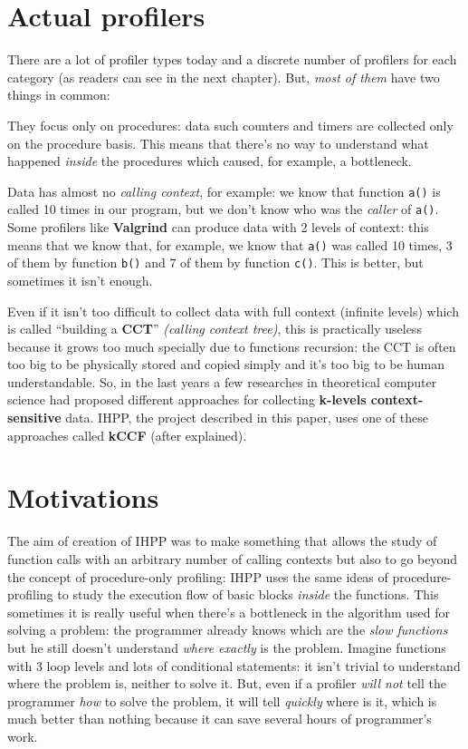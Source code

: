 \documentclass[a4paper,11pt]{report}
\begin{document}
\section{Actual profilers}

There are a lot of profiler types today and a discrete number of profilers for each category (as readers can see in the next chapter). But, \emph{most of them} have two things in common:

\begin{itemize*}
\item They focus only on procedures: data such counters and timers are collected only on the procedure basis. This means that there's no way to understand what happened \emph{inside} the procedures which caused, for example, a bottleneck.
\item Data has almost no \emph{calling context}, for example: we know that function \verb|a()| is called 10 times in our program, but we don't know who was the \emph{caller} of \verb|a()|. Some profilers like \textbf{Valgrind} can produce data with 2 levels of context: this means that we know that, for example, we know that \verb|a()| was called 10 times, 3 of them by function \verb|b()| and 7 of them by function \verb|c()|. This is better, but sometimes it isn't enough.
\end{itemize*}

Even if it isn't too difficult to collect data with full context (infinite levels) which is called ``building a \textbf{CCT}'' \emph{(calling context tree)}, this is practically useless because it grows too much specially due to functions recursion: the CCT is often too big to be physically stored and copied simply and it's too big to be human understandable. 
So, in the last years a few researches in theoretical computer science had proposed different approaches for collecting \textbf{k-levels context-sensitive} data. IHPP, the project described in this paper, uses one of these approaches called \textbf{kCCF} (after explained).

\section{Motivations}

The aim of creation of IHPP was to make something that allows the study of function calls with an arbitrary number of calling contexts but also to go beyond the concept of procedure-only profiling: IHPP uses the same ideas of procedure-profiling to study the execution flow of basic blocks \emph{inside} the functions. This sometimes it is really useful when there's a bottleneck in the algorithm used for solving a problem: the programmer already knows which are the \emph{slow functions} but he still doesn't understand \emph{where exactly} is the problem. Imagine functions with 3 loop levels and lots of conditional statements: it isn't trivial to understand where the problem is, neither to solve it. But, even if a profiler \emph{will not} tell the programmer \emph{how} to solve the problem, it will tell \emph{quickly} where is it, which is much better than nothing because it can save several hours of programmer's work. 
\end{document}
